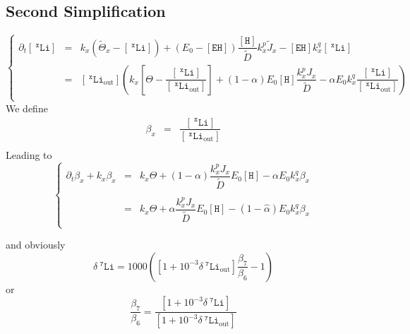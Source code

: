 \documentclass[aps,onecolumn,12pt]{revtex4}
\newcommand{\mychem}[1]{\mathtt{#1}}
\newcommand{\myconc}[1]{\left\lbrack{#1}\right\rbrack}
\newcommand{\spLi}[1]{{~^{\mychem{#1}}\mychem{Li}}}
\newcommand{\Li}[1]{\myconc{\spLi{#1}}}
\newcommand{\spLiOut}[1]{{\spLi{#1}}_{\mathrm{out}}}
\newcommand{\LiOut}[1]{\myconc{\spLiOut{#1}}}
\newcommand{\spEHin}{\mychem{EH}}
\newcommand{\EHin}{\myconc{\spEHin}}
\newcommand{\spproton}{\mychem{H}}
\newcommand{\proton}{\myconc{\spproton}}
\newcommand{\deltaLi}{ {\delta\!\!\!\spLi{7}} }
\newcommand{\deltaLiOut}{{\deltaLi}_{\mathrm{out}}}
\begin{document}
\subsection{Second Simplification}
\begin{equation}
\left\lbrace
\begin{array}{rcl}
\partial_t\Li{x} & = & k_x \left(\tilde{\Theta}_x -\Li{x} \right)  + \left(E_0-\EHin\right) \dfrac{\proton}{\tilde{D}}   k_x^p \tilde{J}_x  - \EHin k_x^q \Li{x}\\
 &=&   \LiOut{x} \left( k_x
 	\left[\Theta-\dfrac{\Li{x}}{\LiOut{x}}\right] 
	+ \left(1-\alpha\right) E_0 \proton \dfrac{ k_x^p J_x}{\tilde{D}}
 - \alpha  E_0 k_x^q \dfrac{\Li{x}}{\LiOut{x}} \right) \\
\end{array}
\right.
\end{equation}
We define
\begin{equation}
\begin{array}{rcl}
\beta_x & = & \dfrac{\Li{x}}{\LiOut{x}} \\
\end{array}
\end{equation}
Leading to
\begin{equation}
\left\lbrace
\begin{array}{rcl}
\partial_t \beta_x + k_x \beta_x 
& = & k_x \Theta  + \left(1-\alpha\right) \dfrac{ k_x^p J_x}{\tilde{D}} E_0 \proton  - \alpha E_0 k_x^q \beta_x \\
\\
& = & k_x \Theta  +  \hat\alpha \dfrac{ k_x^p J_x}{\tilde{D}} E_0 \proton  -  \left(1-\hat\alpha\right) E_0 k_x^q \beta_x \\
\end{array}
\right.
\end{equation}

and obviously
\begin{equation}
	\deltaLi = 1000 \left ( \left[1+10^{-3}\deltaLiOut\right] \dfrac{\beta_7}{\beta_6}-1\right)
\end{equation}
or
\begin{equation}
	\dfrac{ \beta_7}{\beta_6} = \dfrac{\left[1+10^{-3}\deltaLi\right]}{\left[1+10^{-3}\deltaLiOut\right]}
\end{equation}
\end{document}
